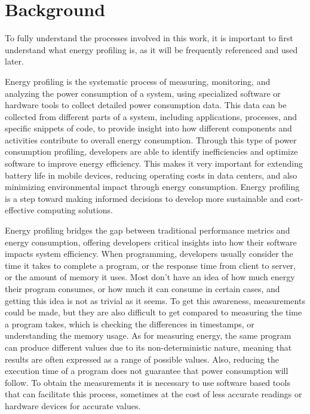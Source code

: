 \chapter{Background}\label{chapter:background}

To fully understand the processes involved in this work, it is important to first understand what energy profiling is, as it will be frequently referenced and used later.

Energy profiling is the systematic process of measuring, monitoring, and analyzing the power consumption of a system, using specialized software or hardware tools to collect detailed power consumption data. This data can be collected from different parts of a system, including applications, processes, and specific snippets of code, to provide insight into how different components and activities contribute to overall energy consumption. Through this type of power consumption profiling, developers are able to identify inefficiencies and optimize software to improve energy efficiency. This makes it very important for extending battery life in mobile devices, reducing operating costs in data centers, and also minimizing environmental impact through energy consumption. Energy profiling is a step toward making informed decisions to develop more sustainable and cost-effective computing solutions.

Energy profiling bridges the gap between traditional performance metrics and energy consumption, offering developers critical insights into how their software impacts system efficiency.
When programming, developers usually consider the time it takes to complete a program, or the response time from client to server, or the amount of memory it uses. Most don't have an idea of how much energy their program consumes, or how much it can consume in certain cases, and getting this idea is not as trivial as it seems. To get this awareness, measurements could be made, but they are also difficult to get compared to measuring the time a program takes, which is checking the differences in timestamps, or understanding the memory usage. As for measuring energy, the same program can produce different values due to its non-deterministic nature, meaning that results are often expressed as a range of possible values. Also, reducing the execution time of a program does not guarantee that power consumption will follow\cite{10.1145/3136014.3136031}. To obtain the measurements it is necessary to use software based tools that can facilitate this process, sometimes at the cost of less accurate readings or hardware devices for accurate values.

